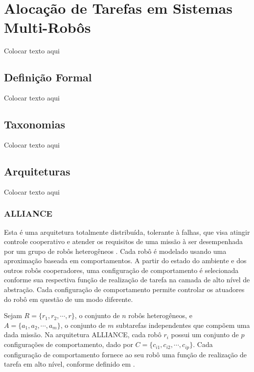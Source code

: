 \chapter[Alocação de Tarefas em Sistemas Multi-Robôs]{Alocação de Tarefas em Sistemas Multi-Robôs} \label{cap:cap3}
Colocar texto aqui 

\section{Definição Formal} \label{sec:sec3_1}
Colocar texto aqui

\section{Taxonomias} \label{sec:sec3_2}
Colocar texto aqui

\section{Arquiteturas} \label{sec:sec3_3}
Colocar texto aqui

\subsection{ALLIANCE} \label{sub:sub3_3_1}

Esta é uma arquitetura totalmente distribuída, tolerante à falhas, que visa atingir controle cooperativo e atender os requisitos de uma missão à ser desempenhada por um grupo de robôs heterogêneos \cite{ref:parker1998alliance}. Cada robô é modelado usando uma aproximação baseada em comportamentos. A partir do estado do ambiente e dos outros robôs cooperadores, uma configuração de comportamento é selecionada conforme sua respectiva função de realização de tarefa na camada de alto nível de abstração. Cada configuração de comportamento permite controlar os atuadores do robô em questão de um modo diferente.

Sejam $R=\{r_1, r_2, \cdots, r\}$, o conjunto de $n$ robôs heterogêneos, e $A=\{a_1,a_2, \cdots,\allowbreak a_m\}$, o conjunto de $m$ subtarefas independentes que compõem uma dada missão. Na arquitetura ALLIANCE, cada robô $r_i$ possui um conjunto de $p$ configurações de comportamento, dado por $C=\{c_{i1}, c_{i2},\cdots, c_{ip}\}$. Cada configuração de comportamento fornece ao seu robô uma função de realização de tarefa em alto nível, conforme definido em \cite{ref:brooks1986robust}. 

